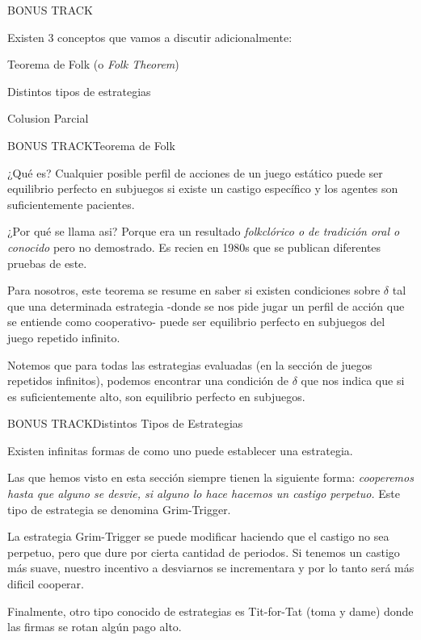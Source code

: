\documentclass[notes, 11pt]{beamer} %
\newenvironment{wideitemize}{\itemize\addtolength{\itemsep}{10pt}}{\enditemize}
\begin{document}
\begin{frame}{BONUS TRACK}
\begin{wideitemize}
	\item<1-> Existen 3 conceptos que vamos a discutir adicionalmente:
	\begin{wideitemize}
		\item<2->[--] Teorema de Folk (o \textit{Folk Theorem})
		\item<3->[--] Distintos tipos de estrategias
		\item<4->[--] Colusion Parcial
	\end{wideitemize}
\end{wideitemize}
\end{frame}

\begin{frame}{BONUS TRACK}{Teorema de Folk}
\begin{wideitemize}
	\item<1-> ¿Qu\'e es? Cualquier posible perfil de acciones de un juego est\'atico puede ser equilibrio perfecto en subjuegos si existe un castigo espec\'ifico y los agentes son suficientemente pacientes.
	\item<2-> ¿Por qu\'e se llama asi? Porque era un resultado \textit{folkcl\'orico o de tradici\'on oral o conocido} pero no demostrado. Es recien en 1980s que se publican diferentes pruebas de este.
	\item<3-> Para nosotros, este teorema se resume en saber si existen condiciones sobre $\delta$ tal que una determinada estrategia -donde se nos pide jugar un perfil de acci\'on que se entiende como cooperativo- puede ser equilibrio perfecto en subjuegos del juego repetido infinito.
	\item<4-> Notemos que para todas las estrategias evaluadas (en la secci\'on de juegos repetidos infinitos), podemos encontrar una condici\'on de $\delta$ que nos indica que si es suficientemente alto, son equilibrio perfecto en subjuegos.
\end{wideitemize}
\end{frame}

\begin{frame}{BONUS TRACK}{Distintos Tipos de Estrategias}
\begin{wideitemize}
	\item<1-> Existen infinitas formas de como uno puede establecer una estrategia.
	\item<2-> Las que hemos visto en esta secci\'on siempre tienen la siguiente forma: \textit{cooperemos hasta que alguno se desvie, si alguno lo hace hacemos un castigo perpetuo.} Este tipo de estrategia se denomina Grim-Trigger.
	\item<3-> La estrategia Grim-Trigger se puede modificar haciendo que el castigo no sea perpetuo, pero que dure por cierta cantidad de periodos. Si tenemos un castigo m\'as suave, nuestro incentivo a desviarnos se incrementara y por lo tanto ser\'a m\'as dificil cooperar.
	\item<4-> Finalmente, otro tipo conocido de estrategias es Tit-for-Tat (toma y dame) donde las firmas se rotan alg\'un pago alto. 
\end{wideitemize}
\end{frame}
\end{document}
